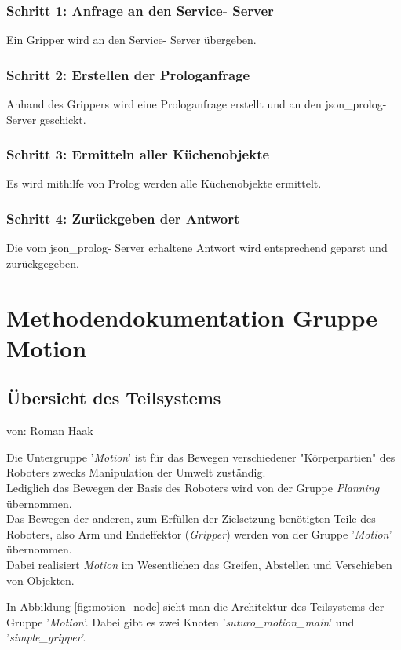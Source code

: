 \documentclass{suturo}
\makeatletter
\newcommand{\chapterauthor}[1]{%
  {\parindent0pt\vspace*{-27pt}%
  \linespread{0}\small\begin{flushright}von: #1\end{flushright}%
  \par\nobreak\vspace*{0pt}}
  \@afterheading%
}
\makeatother
\begin{document}
\subsubsection{Schritt 1: Anfrage an den Service- Server}
Ein Gripper wird an den Service- Server übergeben.
\subsubsection{Schritt 2: Erstellen der Prologanfrage}
Anhand des Grippers wird eine Prologanfrage erstellt und an den json\_prolog- Server geschickt.
\subsubsection{Schritt 3: Ermitteln aller Küchenobjekte} 
Es wird mithilfe von Prolog werden alle Küchenobjekte ermittelt.
\subsubsection{Schritt 4: Zurückgeben der Antwort}
Die vom json\_prolog- Server erhaltene Antwort wird entsprechend geparst und zurückgegeben.



\newpage

\section{Methodendokumentation Gruppe Motion}

\subsection{Übersicht des Teilsystems}
\chapterauthor{Roman Haak}
Die Untergruppe '\textit{Motion}' ist für das Bewegen verschiedener "Körperpartien" des Roboters zwecks Manipulation der Umwelt zuständig.\\
Lediglich das Bewegen der Basis des Roboters wird von der Gruppe \textit{Planning} übernommen.\\
Das Bewegen der anderen, zum Erfüllen der Zielsetzung benötigten Teile des Roboters, also Arm und Endeffektor (\textit{Gripper}) werden 
von der Gruppe '\textit{Motion}' übernommen.\\
Dabei realisiert \textit{Motion} im Wesentlichen das Greifen, Abstellen und Verschieben von Objekten.

In Abbildung \ref{fig:motion_node} sieht man die Architektur des Teilsystems der Gruppe '\textit{Motion}'. Dabei gibt es zwei Knoten '\textit{suturo\_motion\_main}' und '\textit{simple\_gripper}'.\\
\end{document}
